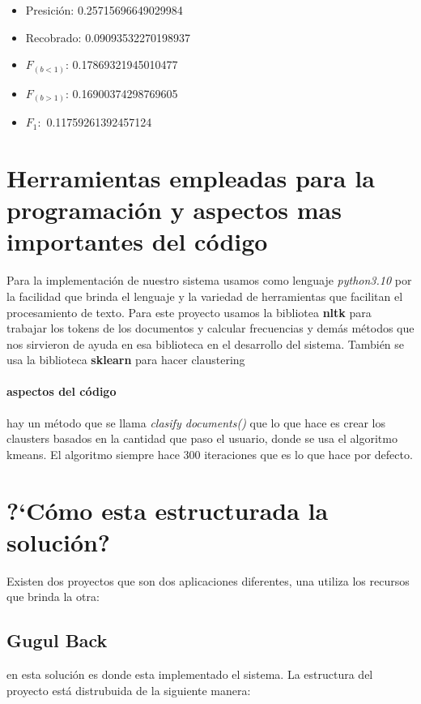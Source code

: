 \documentclass{llncs}
\begin{document}
\begin{flushleft}
		\begin{itemize}
			\item Presici\'on:  0.25715696649029984
			\item Recobrado:  0.09093532270198937
			\item $F_{(b<1)}$: 0.17869321945010477
			\item $F_{(b>1)}$:  0.16900374298769605
			\item $F_1:$ 0.11759261392457124
		\end{itemize}
		
		
	\end{flushleft}
	
	
	
	
	
	
	
	\section{Herramientas empleadas para la programaci\'on y aspectos mas importantes del c\'odigo} 
	
	Para la implementaci\'on de nuestro sistema usamos como lenguaje \textit{python3.10} por la facilidad que brinda el lenguaje y la variedad de herramientas que facilitan el procesamiento de texto. Para este proyecto usamos la bibliotea \textbf{nltk} para trabajar los tokens de los documentos y calcular frecuencias y dem\'as m\'etodos que nos sirvieron de ayuda en esa biblioteca en el desarrollo del sistema. Tambi\'en se usa la biblioteca \textbf{sklearn} para hacer claustering 
	
	\paragraph{aspectos del c\'odigo} 
	hay un m\'etodo que se llama \textit{clasify documents()} que lo que hace es crear los clausters basados en la cantidad que paso el usuario, donde se usa el algoritmo kmeans. El algoritmo siempre hace 300 iteraciones que es lo que hace por defecto.
	
	
	\section{?`C\'omo esta estructurada la soluci\'on?} 
	Existen dos proyectos que son dos aplicaciones diferentes, una utiliza los recursos que brinda la otra: 
	
	\subsection{Gugul Back}
	en esta soluci\'on es donde esta implementado el sistema. La estructura del proyecto est\'a distrubuida de la siguiente manera:
	
\end{document}
